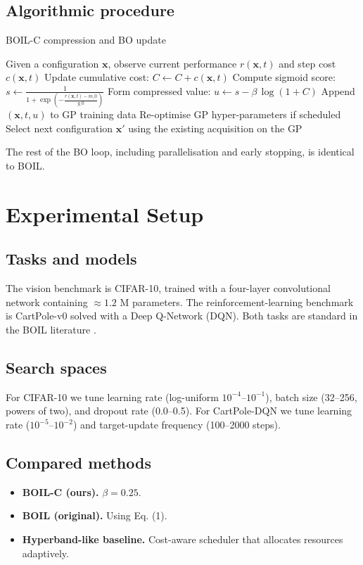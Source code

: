\documentclass{article} %
\begin{document}
\subsection{Algorithmic procedure}
\begin{algorithm}[H]
\caption{BOIL-C compression and BO update}
\begin{algorithmic}[1]
  \State Given a configuration \(\mathbf{x}\), observe current performance \(r(\mathbf{x}, t)\) and step cost \(c(\mathbf{x}, t)\)
  \State Update cumulative cost: \(C \leftarrow C + c(\mathbf{x}, t)\)
  \State Compute sigmoid score: \(s \leftarrow \frac{1}{1 + \exp\!\left(-\frac{r(\mathbf{x}, t) - m\_0}{g\_0}\right)}\)
  \State Form compressed value: \(u \leftarrow s - \beta\,\log(1 + C)\)
  \State Append \((\mathbf{x}, t, u)\) to GP training data
  \State Re-optimise GP hyper-parameters if scheduled
  \State Select next configuration \(\mathbf{x}'\) using the existing acquisition on the GP
\end{algorithmic}
\end{algorithm}

The rest of the BO loop, including parallelisation and early stopping, is identical to BOIL.

\section{Experimental Setup}
\label{sec:experimental}
\subsection{Tasks and models}
The vision benchmark is CIFAR-10, trained with a four-layer convolutional network containing \(\approx 1.2\) M parameters. The reinforcement-learning benchmark is CartPole-v0 solved with a Deep Q-Network (DQN). Both tasks are standard in the BOIL literature \cite{nguyen-2019-bayesian}.

\subsection{Search spaces}
For CIFAR-10 we tune learning rate (log-uniform \(10^{-4}\)–\(10^{-1}\)), batch size (32–256, powers of two), and dropout rate (0.0–0.5). For CartPole-DQN we tune learning rate (\(10^{-5}\)–\(10^{-2}\)) and target-update frequency (100–2000 steps).

\subsection{Compared methods}
\begin{itemize}
  \item \textbf{BOIL-C (ours).} \(\beta = 0.25\).
  \item \textbf{BOIL (original).} Using Eq. (1).
  \item \textbf{Hyperband-like baseline.} Cost-aware scheduler that allocates resources adaptively.
\end{itemize}
\end{document}
